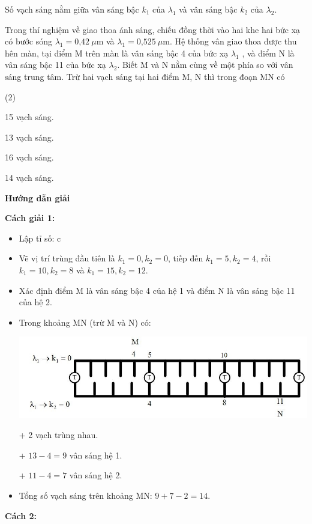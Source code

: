 \begin{dang}{Số vạch sáng nằm giữa vân sáng bậc $k_1$ của $\lambda_1$ và vân sáng bậc $k_2$ của $\lambda_2$.}
	{
		Trong thí nghiệm về giao thoa ánh sáng, chiếu đồng thời vào hai khe hai bức xạ có bước sóng $\lambda_1 = \text{0,42}\ \mu \text{m}$ và $\lambda_1 = \text{0,525}\ \mu \text{m}$. Hệ thống vân giao thoa được thu hên màn, tại điểm M trên màn là vân sáng bậc 4 của bức xạ $\lambda_1$ , và điểm N là vân sáng bậc 11 của bức xạ $\lambda_2$. Biết M và N nằm cùng về một phía so với vân sáng trung tâm. Trừ hai vạch sáng tại hai điểm M, N thì trong đoạn MN có
		\begin{mcq}(2)
			\item 15 vạch sáng. 
			\item 13 vạch sáng. 		
			\item 16 vạch sáng.  		 
			\item 14 vạch sáng.
		\end{mcq}
	}
	{\begin{center}
			\textbf{Hướng dẫn giải}
		\end{center}
		\textbf{Cách giải 1:}
		\begin{itemize}
			\item Lập tỉ số: 
			c
			\item Vẽ vị trí trùng đầu tiên là $k_1 = 0, k_2 = 0$, tiếp đến $k_1 = 5, k_2 = 4$, rồi $k_1 = 10, k_2 = 8$ và $k_1 = 15, k_2 = 12$.
			\item Xác định điểm M là vân sáng bậc 4 của hệ 1 và điểm N là vân sáng bậc 11 của hệ 2.
			\item Trong khoảng MN (trừ M và N) có: 
			
			\begin{center}
				\includegraphics[scale=0.7]{../figs/VN12-PH-33-A-017-2-1.JPG}
			\end{center}	
			
			+ 2 vạch trùng nhau.
			
			+ $13-4=9$ vân sáng hệ 1.
			
			+ $11-4=7$ vân sáng hệ 2.
			\item Tổng số vạch sáng trên khoảng MN: $9+7-2=14$.   
			
		\end{itemize}
		
		\textbf{Cách 2:}
		
}
\end{dang}

